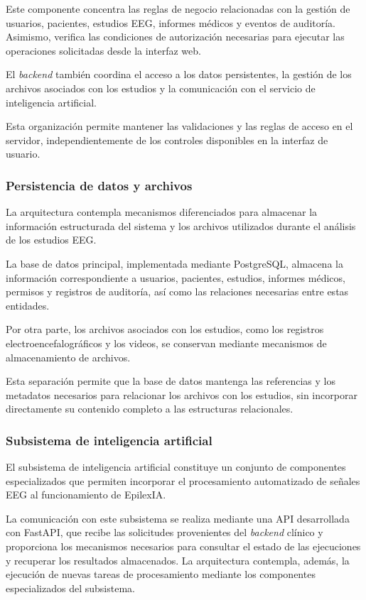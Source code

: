 Este componente concentra las reglas de negocio
relacionadas con la gestión de usuarios, pacientes,
estudios EEG, informes médicos y eventos de auditoría.
Asimismo, verifica las condiciones de autorización
necesarias para ejecutar las operaciones solicitadas
desde la interfaz web.

El \textit{backend} también coordina el acceso a los datos
persistentes, la gestión de los archivos asociados
con los estudios y la comunicación con el servicio
de inteligencia artificial.

Esta organización permite mantener las validaciones
y las reglas de acceso en el servidor, independientemente
de los controles disponibles en la interfaz de usuario.

\subsubsection{Persistencia de datos y archivos}

La arquitectura contempla mecanismos diferenciados
para almacenar la información estructurada del sistema
y los archivos utilizados durante el análisis de los
estudios EEG.

La base de datos principal, implementada mediante
PostgreSQL, almacena la información correspondiente
a usuarios, pacientes, estudios, informes médicos,
permisos y registros de auditoría, así como las
relaciones necesarias entre estas entidades.

Por otra parte, los archivos asociados con los
estudios, como los registros electroencefalográficos
y los videos, se conservan mediante mecanismos
de almacenamiento de archivos.

Esta separación permite que la base de datos
mantenga las referencias y los metadatos necesarios
para relacionar los archivos con los estudios,
sin incorporar directamente su contenido completo
a las estructuras relacionales.

\subsubsection{Subsistema de inteligencia artificial}

El subsistema de inteligencia artificial constituye
un conjunto de componentes especializados que
permiten incorporar el procesamiento automatizado
de señales EEG al funcionamiento de EpilexIA.


La comunicación con este subsistema se realiza mediante una API desarrollada con FastAPI, que recibe las solicitudes provenientes del \textit{backend} clínico y proporciona los mecanismos necesarios para consultar el estado de las ejecuciones y recuperar los resultados almacenados. La arquitectura contempla, además, la ejecución de nuevas tareas de procesamiento mediante los componentes especializados del subsistema.



